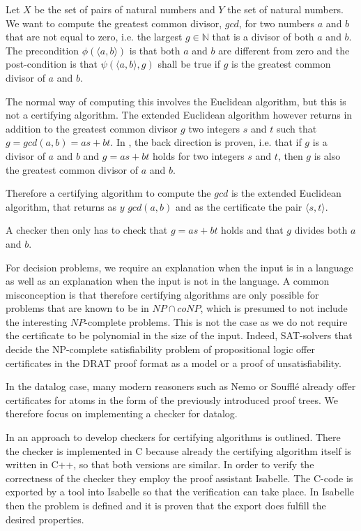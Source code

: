 \begin{example}
    Let $X$ be the set of pairs of natural numbers and $Y$ the set of natural numbers. We want to compute the greatest common divisor, $gcd$, for two numbers $a$ and $b$ that are not equal to zero, i.e. the largest $g \in \mathbb{N}$ that is a divisor of both $a$ and $b$. The precondition $\phi(\langle a, b\rangle)$ is that both $a$ and $b$ are different from zero and the post-condition is that $\psi(\langle a, b\rangle, g)$ shall be true if $g$ is the greatest common divisor of $a$ and $b$.

    The normal way of computing this involves the Euclidean algorithm, but this is not a certifying algorithm. The extended Euclidean algorithm however returns in addition to the greatest common divisor $g$ two integers $s$ and $t$ such that $g = gcd(a,b) = a s + b t$. In \cite{CertAlg}, the back direction is proven, i.e. that if $g$ is a divisor of $a$ and $b$ and $g = a s + b  t$ holds for two integers $s$ and $t$, then $g$ is also the greatest common divisor of $a$ and $b$.

    Therefore a certifying algorithm to compute the $gcd$ is the extended Euclidean algorithm, that returns as $y$ $gcd(a,b)$ and as the certificate the pair $\langle s, t\rangle$.

    A checker then only has to check that $g=a s + b t$ holds and that $g$ divides both $a$ and $b$. 
\end{example}

For decision problems, we require an explanation when the input is in a language as well as an explanation when the input is not in the language. A common misconception is that therefore certifying algorithms are only possible for problems that are known to be in $NP \cap coNP$, which is presumed to not include the interesting $NP$-complete problems. This is not the case as we do not require the certificate to be polynomial in the size of the input. Indeed, SAT-solvers that decide the NP-complete satisfiability problem of propositional logic offer certificates in the DRAT proof format as a model or a proof of unsatisfiability\cite{DRAT}.

In the datalog case, many modern reasoners such as Nemo or Soufflé already offer certificates for atoms in the form of the previously introduced proof trees. We therefore focus on implementing a checker for datalog.

In \cite{CertCheckerWorkflow} an approach to develop checkers for certifying algorithms is outlined. There the checker is implemented in C because already the certifying algorithm itself is written in C++, so that both versions are similar. In order to verify the correctness of the checker they employ the proof assistant Isabelle. The C-code is exported by a tool into Isabelle so that the verification can take place. In Isabelle then the problem is defined and it is proven that the export does fulfill the desired properties. 

